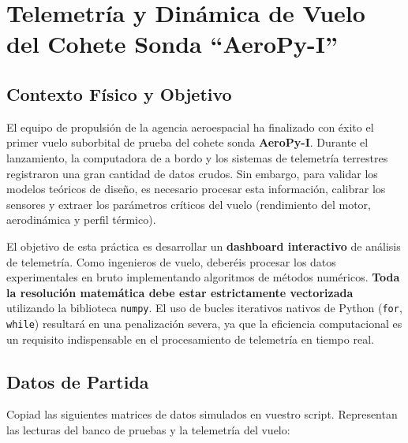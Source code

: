 

\section{Telemetría y Dinámica de Vuelo del Cohete Sonda ``AeroPy-I''}

	
	\subsection*{Contexto Físico y Objetivo}
	
	El equipo de propulsión de la agencia aeroespacial ha finalizado con éxito el primer vuelo suborbital de prueba del cohete sonda \textbf{AeroPy-I}. Durante el lanzamiento, la computadora de a bordo y los sistemas de telemetría terrestres registraron una gran cantidad de datos crudos. Sin embargo, para validar los modelos teóricos de diseño, es necesario procesar esta información, calibrar los sensores y extraer los parámetros críticos del vuelo (rendimiento del motor, aerodinámica y perfil térmico).
	
	El objetivo de esta práctica es desarrollar un \textbf{dashboard interactivo} de análisis de telemetría. Como ingenieros de vuelo, deberéis procesar los datos experimentales en bruto implementando algoritmos de métodos numéricos. \textbf{Toda la resolución matemática debe estar estrictamente vectorizada} utilizando la biblioteca \texttt{numpy}. El uso de bucles iterativos nativos de Python (\texttt{for}, \texttt{while}) resultará en una penalización severa, ya que la eficiencia computacional es un requisito indispensable en el procesamiento de telemetría en tiempo real.
	
	\subsection*{Datos de Partida}
	
	Copiad las siguientes matrices de datos simulados en vuestro script. Representan las lecturas del banco de pruebas y la telemetría del vuelo:
	
